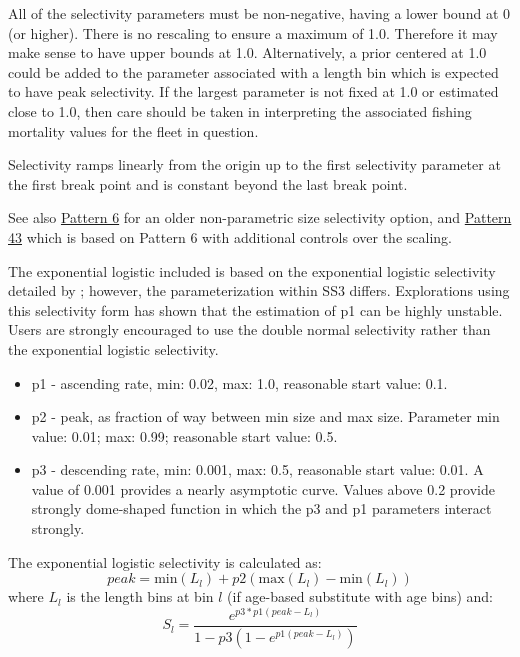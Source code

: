 All of the selectivity parameters must be non-negative, having a lower bound at 0 (or higher). There is no rescaling to ensure a maximum of 1.0. Therefore it may make sense to have upper bounds at 1.0. Alternatively, a prior centered at 1.0 could be added to the parameter associated with a length bin which is expected to have peak selectivity. If the largest parameter is not fixed at 1.0 or estimated close to 1.0, then care should be taken in interpreting the associated fishing mortality values for the fleet in question.

Selectivity ramps linearly from the origin up to the first selectivity parameter at the first break point and is constant beyond the last break point.

See also \hyperlink{NonParamSelectivity6}{Pattern 6} for an older non-parametric size selectivity option, and \hyperlink{NonParamScaling}{Pattern 43} which is based on Pattern 6 with additional controls over the scaling.

\hypertarget{ExponentialLogistic}{}
The exponential logistic included is based on the exponential logistic selectivity detailed by \citet{thompson-confounding-1994}; however, the parameterization within SS3 differs. Explorations using this selectivity form has shown that the estimation of p1 can be highly unstable. Users are strongly encouraged to use the double normal selectivity rather than the exponential logistic selectivity.
	\begin{itemize}
		\item p1 - ascending rate, min: 0.02, max: 1.0, reasonable start value: 0.1.
		\item p2 - peak, as fraction of way between min size and max size. Parameter min value: 0.01; max: 0.99; reasonable start value: 0.5.
		\item p3 - descending rate, min: 0.001, max: 0.5, reasonable start value: 0.01. A value of 0.001 provides a nearly asymptotic curve. Values above 0.2 provide strongly dome-shaped function in which the p3 and p1 parameters interact strongly.
	\end{itemize}

The exponential logistic selectivity is calculated as:
	\begin{equation}
	peak = \text{min}(L_l) + p2(\text{max}(L_l) - \text{min}(L_l) )
	\end{equation}
where $L_l$ is the length bins at bin $l$ (if age-based substitute with age bins) and:
	\begin{equation}
	S_l = \frac{e^{p3*p1(peak-L_l)}}{1-p3(1-e^{p1(peak- L_l)})}
	\end{equation}

